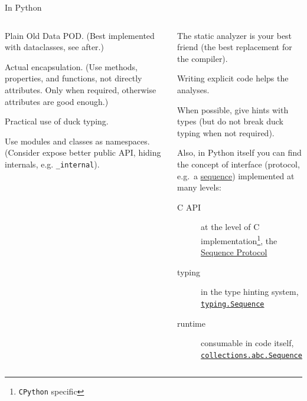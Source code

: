 \documentclass[9pt]{beamer}
\begin{document}
\begin{frame}{In Python}
    \begin{columns}
        \begin{column}{0.5\textwidth}
            Plain Old Data POD.
            (Best implemented with dataclasses, see after.)

            Actual encapsulation.
            (Use methods, properties, and functions, not directly attributes.
            Only when required, otherwise attributes are good enough.)

            Practical use of duck typing.

            Use modules and classes as namespaces.
            (Consider expose better public API, hiding internals, e.g.
            \texttt{\_internal}).
        \end{column}
        \begin{column}{0.5\textwidth}
            The static analyzer is your best friend (the best replacement for
            the compiler).

            Writing explicit code helps the analyses.

            When possible, give hints with types (but do not break duck typing
            when not required).

            Also, in Python itself you can find the concept of interface
            (protocol, e.g.\ a
            \href{https://docs.python.org/3/glossary.html\#term-sequence}{sequence})
            implemented at many levels:

            \begin{description}
                \item[C API] at the level of C implementation\footnote{
                        \texttt{CPython} specific
                    }, the
                    \href{https://docs.python.org/3/c-api/sequence.html}{Sequence
                    Protocol}
                \item[typing] in the type hinting system,
                    \href{https://docs.python.org/3/library/typing.html?highlight=sequence\#typing.Sequence}{\texttt{typing.Sequence}}
                \item[runtime] consumable in code itself,
                    \href{https://docs.python.org/3/library/collections.abc.html?highlight=sequence\#collections.abc.Sequence}{\texttt{collections.abc.Sequence}} 

            \end{description}
        \end{column}
    \end{columns}
\end{frame}
\end{document}
